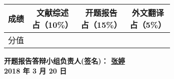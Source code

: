 {{		\vspace{2em}

		{
			\renewcommand{\baselinestretch}{1}
			\songti\sihao
			
\begin{flushleft}
	\begin{tabular}{|c|c|c|c|}
		\hline
		成绩 & \parbox[c]{4em}{\vspace{0.5em}\xiaosi 文献综述                              \\ 占（10\%） \vspace{0.5em}} & \parbox[c]{4em}{\vspace{0.5em}\xiaosi 开题报告 \\ 占（15\%） \vspace{0.5em}} & \parbox[c]{4em}{\vspace{0.5em}\xiaosi 外文翻译 \\ 占（5\%） \vspace{0.5em}} \\
		\hline
		分值 & {}                                    & {} & {} \\
		\hline
	\end{tabular}
\end{flushleft}

\vspace{7em}

\begin{flushright}

	{
		\songti\xiaosi\bfseries
		开题报告答辩小组负责人(签名)： \; \underline{\quad 张婷 \quad} \\
		2018 年 3 月 20 日 \par
	}
\end{flushright}
		}
	}









}
